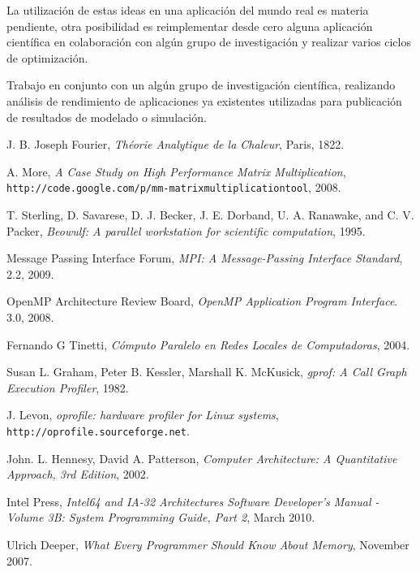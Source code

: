 \documentclass[a4paper]{report}
\begin{document}
La utilizaci\'on de estas ideas en una aplicaci\'on del mundo real es materia
pendiente, otra posibilidad es reimplementar desde cero alguna aplicaci\'on
cient\'ifica en colaboraci\'on con alg\'un grupo de investigaci\'on y realizar
varios ciclos de optimizaci\'on.

\bigskip

Trabajo en conjunto con un alg\'un grupo de investigaci\'on cient\'ifica,
realizando an\'alisis de rendimiento de aplicaciones ya existentes utilizadas
para publicaci\'on de resultados de modelado o simulaci\'on.

\begin{thebibliography}{9}

  J. B. Joseph Fourier, \emph{Th\'eorie Analytique de la Chaleur}, Paris, 1822.

  A. More,
  \emph{A Case Study on High Performance Matrix Multiplication},
  {\tt http://code.google.com/p/mm-matrixmultiplicationtool},
  2008.

  T. Sterling, D. Savarese, D. J. Becker, J. E. Dorband, U. A. Ranawake,
  and C. V. Packer,
  \emph{Beowulf: A parallel workstation for scientific computation},
  1995.

  Message Passing Interface Forum,
  \emph{MPI: A Message-Passing Interface Standard},
  2.2,
  2009.

  OpenMP Architecture Review Board,
  \emph{OpenMP Application Program Interface}.
  3.0,
  2008.

  Fernando G Tinetti,
  \emph{C\'omputo Paralelo en Redes Locales de Computadoras},
  2004.

  Susan L. Graham,  Peter B. Kessler,  Marshall K. McKusick,
  \emph{gprof: A Call Graph Execution Profiler},
  1982.
  
  J. Levon,
  \emph{oprofile: hardware profiler for Linux systems},
       {\tt http://oprofile.sourceforge.net}.
  
  John. L. Hennesy, David A. Patterson,
  \emph{Computer Architecture: A Quantitative Approach, 3rd Edition},
  2002.

  Intel Press,
  \emph{Intel64 and IA-32 Architectures Software Developer's Manual - Volume
    3B: System Programming Guide, Part 2},
  March 2010.

  Ulrich Deeper,
  \emph{What Every Programmer Should Know About Memory},
  November 2007.


\end{thebibliography}
\end{document}
